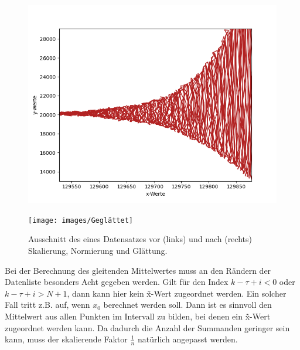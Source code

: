 \begin{figure}[htb]
    \centering
    \begin{minipage}{.5\textwidth}
        \centering
        \includegraphics[width=\linewidth]{images/EingabeNichtGlatt}
    \end{minipage}%
    \begin{minipage}{.5\textwidth}
        \centering
        \texttt{[image: images/Geglättet]}
    \end{minipage}
    \caption{Ausschnitt des eines Datensatzes vor (links) und nach (rechts) Skalierung, Normierung und Glättung.}
    \label{fig:glaettung}
\end{figure}
\pagebreak
Bei der Berechnung des gleitenden Mittelwertes muss an den Rändern der Datenliste besonders Acht gegeben werden.
Gilt für den Index $k-\tau+i < 0$ oder $k-\tau+i > N + 1$, dann kann hier kein \~x-Wert zugeordnet werden.
Ein solcher Fall tritt z.B. auf, wenn $x_0$ berechnet werden soll.
Dann ist es sinnvoll den Mittelwert aus allen Punkten im Intervall zu bilden, bei denen ein \~x-Wert zugeordnet werden kann.
Da dadurch die Anzahl der Summanden geringer sein kann, muss der skalierende Faktor $\frac{1}{n}$ natürlich angepasst werden.







